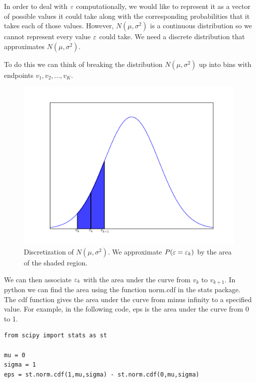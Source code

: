 In order to deal with $\varepsilon$ computationally, we would like to represent it as a vector of possible values it could take along with the corresponding probabilities that it takes each of those values.  However, $N(\mu,\sigma^2)$ is a continuous distribution so we cannot represent every value $\varepsilon$ could take.  We need a discrete distribution that approximates $N(\mu,\sigma^2)$.

To do this we can think of breaking the distribution $N(\mu,\sigma^2)$ up into bins with endpoints $v_1,v_2,\ldots, v_K$.

\begin{figure}[h!]
\label{stoch1_fig1}
\begin{center}
\includegraphics[width = \textwidth]{discnorm.pdf}
\end{center}
\caption{Discretization of $N(\mu,\sigma^2)$.  We approximate $P(\varepsilon = \varepsilon_k)$ by the area of the shaded region.}
\end{figure}

We can then associate $\varepsilon_k$ with the area under the curve from $v_k$ to $v_{k+1}$.  In python we can find the area using the function norm.cdf in the stats package.  The cdf function gives the area under the curve from minus infinity to a specified value.  For example, in the following code, eps is the area under the curve from 0 to 1.

\begin{lstlisting}[style=python]
from scipy import stats as st

mu = 0
sigma = 1
eps = st.norm.cdf(1,mu,sigma) - st.norm.cdf(0,mu,sigma)
\end{lstlisting}

